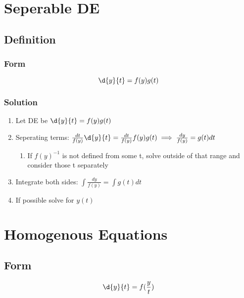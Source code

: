\documentclass[11pt]{article}
\begin{document}
\section{Seperable DE}
\label{sec-6}

\subsection{Definition}
\label{sec-6.1}

\subsubsection{Form}
\label{sec-6.1.1}

    \begin{equation}
    \d{y}{t}=f(y)g(t)
    \end{equation}
\subsubsection{Solution}
\label{sec-6.1.2}

\begin{enumerate}
\item Let DE be $\d{y}{t}=f(y)g(t)$
\item Seperating terms: $\frac{dt}{f(y)}\d{y}{t}=\frac{dt}{f(y)}f(y)g(t) \implies \frac{dy}{f(y)}=g(t)dt$

\begin{enumerate}
\item If $f(y)^{-1}$ is not defined from some t, solve outside of
          that range and consider those t separately
\end{enumerate}

\item Integrate both sides: $\int \frac{dy}{f(y)}=\int g(t)dt$
\item If possible solve for $y(t)$
\end{enumerate}
 
\section{Homogenous Equations}
\label{sec-7}

\subsection{Form}
\label{sec-7.1}

   \begin{equation}
   \d{y}{t}=f(\frac{y}{t})
   \end{equation}
\end{document}
